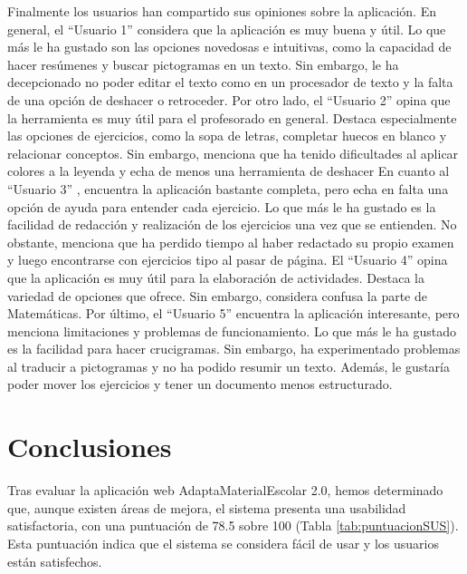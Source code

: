 Finalmente los usuarios han compartido sus opiniones sobre la aplicación. En general, el ``Usuario 1'' considera que la aplicación es muy buena y útil. Lo que más le ha gustado son las opciones novedosas e intuitivas, como la capacidad de hacer resúmenes y buscar pictogramas en un texto. Sin embargo, le ha decepcionado no poder editar el texto como en un procesador de texto y la falta de una opción de deshacer o retroceder. Por otro lado, el ``Usuario 2'' opina que la herramienta es muy útil para el profesorado en general. Destaca especialmente las opciones de ejercicios, como la sopa de letras, completar huecos en blanco y relacionar conceptos. Sin embargo, menciona que ha tenido dificultades al aplicar colores a la leyenda y echa de menos una herramienta de deshacer En cuanto al ``Usuario 3'' , encuentra la aplicación bastante completa, pero echa en falta una opción de ayuda para entender cada ejercicio. Lo que más le ha gustado es la facilidad de redacción y realización de los ejercicios una vez que se entienden. No obstante, menciona que ha perdido tiempo al haber redactado su propio examen y luego encontrarse con ejercicios tipo al pasar de página. El ``Usuario 4'' opina que la aplicación es muy útil para la elaboración de actividades. Destaca la variedad de opciones que ofrece. Sin embargo, considera confusa la parte de Matemáticas. Por último, el ``Usuario 5'' encuentra la aplicación interesante, pero menciona limitaciones y problemas de funcionamiento. Lo que más le ha gustado es la facilidad para hacer crucigramas. Sin embargo, ha experimentado problemas al traducir a pictogramas y no ha podido resumir un texto. Además, le gustaría poder mover los ejercicios y tener un documento menos estructurado.

\section{Conclusiones}\label{sec:conclusionesEvaluacion}
Tras evaluar la aplicación web AdaptaMaterialEscolar 2.0, hemos determinado que, aunque existen áreas de mejora, el sistema presenta una usabilidad satisfactoria, con una puntuación de 78.5 sobre 100 (Tabla \ref{tab:puntuacionSUS}). Esta puntuación indica que el sistema se considera fácil de usar y los usuarios están satisfechos.

